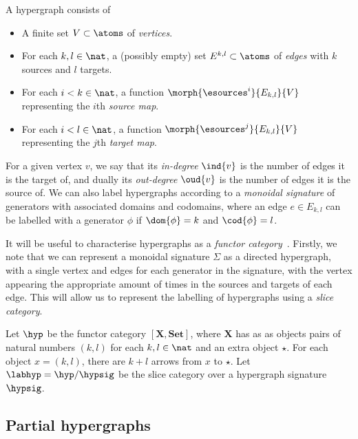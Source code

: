 \documentclass[10pt]{article}
\begin{document}
\begin{definition}
    A hypergraph consists of
    \begin{itemize}
        \item A finite set $V \subset \atoms$ of \emph{vertices}.
        \item For each $k,l \in \nat$, a (possibly empty) set $E^{k,l} \subset \atoms$ of \emph{edges} with $k$ sources and $l$ targets.
        \item For each $i < k \in \nat$, a function $\morph{\esources^i}{E_{k,l}}{V}$ representing the $i$th \emph{source map}.
        \item For each $i < l \in \nat$, a function $\morph{\esources^j}{E_{k,l}}{V}$ representing the $j$th \emph{target map}.
    \end{itemize}
\end{definition}

\noindent For a given vertex $v$, we say that its \emph{in-degree} $\ind{v}$ is the number of edges it is the target of, and dually its \emph{out-degree} $\oud{v}$ is the number of edges it is the source of.
We can also label hypergraphs according to a \emph{monoidal signature} of generators with associated domains and codomains, where an edge $e \in E_{k,l}$ can be labelled with a generator $\phi$ if $\dom{\phi} = k$ and $\cod{\phi} = l$.

It will be useful to characterise hypergraphs as a \emph{functor category}~\cite{bonchi2016rewriting}.
Firstly, we note that we can represent a monoidal signature $\Sigma$ as a directed hypergraph, with a single vertex and edges for each generator in the signature, with the vertex appearing the appropriate amount of times in the sources and targets of each edge.
This will allow us to represent the labelling of hypergraphs using a \emph{slice category}.

\begin{definition}
    Let $\hyp$ be the functor category $[\textbf{X}, \textbf{Set}]$, where $\textbf{X}$ has as as objects pairs of natural numbers $(k,l)$ for each $k,l \in \nat$ and an extra object $\star$.
    For each object $x = (k,l)$, there are $k + l$ arrows from $x$ to $\star$.
    Let $\labhyp = \hyp / \hypsig$ be the slice category over a hypergraph signature $\hypsig$.
\end{definition}

\subsection{Partial hypergraphs}
\end{document}
